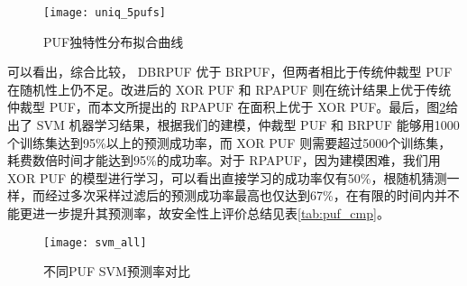 \begin{figure}[htb]
\centering
\texttt{[image: uniq\_5pufs]}
\caption{PUF独特性分布拟合曲线}
\label{fig:pufs_uniq}
\end{figure}

可以看出，综合比较， DBRPUF 优于 BRPUF，但两者相比于传统仲裁型 PUF 在随机性上仍不足。改进后的 XOR PUF 和 RPAPUF 则在统计结果上优于传统仲裁型 PUF，而本文所提出的 RPAPUF 在面积上优于 XOR PUF。最后，图\ref{fig:svm_all}给出了 SVM 机器学习结果，根据我们的建模，仲裁型 PUF 和 BRPUF 能够用1000个训练集达到95\%以上的预测成功率，而 XOR PUF 则需要超过5000个训练集，耗费数倍时间才能达到95\%的成功率。对于 RPAPUF，因为建模困难，我们用 XOR PUF 的模型进行学习，可以看出直接学习的成功率仅有50\%，根随机猜测一样，而经过多次采样过滤后的预测成功率最高也仅达到67\%，在有限的时间内并不能更进一步提升其预测率，故安全性上评价总结见表\ref{tab:puf_cmp}。

\begin{figure}[htb!]
\centering
\texttt{[image: svm\_all]}
\caption{不同PUF SVM预测率对比}
\label{fig:svm_all}
\end{figure}
